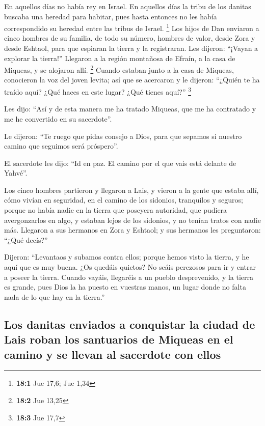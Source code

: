 \begin{paracol}{2}
 En aquellos días no había rey en Israel. En aquellos días
la tribu de los danitas buscaba una heredad para habitar, pues hasta
entonces no les había correspondido su heredad entre las tribus de
Israel. \footnote{\textbf{18:1} Jue 17,6; Jue 1,34}  Los
hijos de Dan enviaron a cinco hombres de su familia, de todo su número,
hombres de valor, desde Zora y desde Eshtaol, para que espiaran la
tierra y la registraran. Les dijeron: ``¡Vayan a explorar la tierra!''
Llegaron a la región montañosa de Efraín, a la casa de Miqueas, y se
alojaron allí. \footnote{\textbf{18:2} Jue 13,25}  Cuando
estaban junto a la casa de Miqueas, conocieron la voz del joven levita;
así que se acercaron y le dijeron: ``¿Quién te ha traído aquí? ¿Qué
haces en este lugar? ¿Qué tienes aquí?'' \footnote{\textbf{18:3} Jue
  17,7}

 Les dijo: ``Así y de esta manera me ha tratado Miqueas,
que me ha contratado y me he convertido en su sacerdote''.

 Le dijeron: ``Te ruego que pidas consejo a Dios, para que
sepamos si nuestro camino que seguimos será próspero''.

 El sacerdote les dijo: ``Id en paz. El camino por el que
vais está delante de Yahvé''.

 Los cinco hombres partieron y llegaron a Lais, y vieron a
la gente que estaba allí, cómo vivían en seguridad, en el camino de los
sidonios, tranquilos y seguros; porque no había nadie en la tierra que
poseyera autoridad, que pudiera avergonzarlos en algo, y estaban lejos
de los sidonios, y no tenían tratos con nadie más. 
Llegaron a sus hermanos en Zora y Eshtaol; y sus hermanos les
preguntaron: ``¿Qué decís?''

 Dijeron: ``Levantaos y subamos contra ellos; porque hemos
visto la tierra, y he aquí que es muy buena. ¿Os quedáis quietos? No
seáis perezosos para ir y entrar a poseer la tierra. 
Cuando vayáis, llegaréis a un pueblo desprevenido, y la tierra es
grande, pues Dios la ha puesto en vuestras manos, un lugar donde no
falta nada de lo que hay en la tierra.''

\hypertarget{los-danitas-enviados-a-conquistar-la-ciudad-de-lais-roban-los-santuarios-de-miqueas-en-el-camino-y-se-llevan-al-sacerdote-con-ellos}{%
\subsection{Los danitas enviados a conquistar la ciudad de Lais roban
los santuarios de Miqueas en el camino y se llevan al sacerdote con
ellos}\label{los-danitas-enviados-a-conquistar-la-ciudad-de-lais-roban-los-santuarios-de-miqueas-en-el-camino-y-se-llevan-al-sacerdote-con-ellos}}


\end{paracol}
